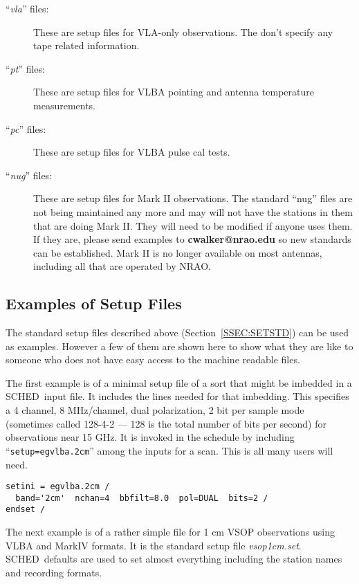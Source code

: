 \documentclass{report}
\newcommand{\schedb}{{\sc SCHED~}}
\begin{document}
\begin{description}
\item[``{\sl vla}'' files:]  These are setup files for VLA-only
observations.  The don't specify any tape related information.

\item[``{\sl pt}'' files:] These are setup files for VLBA pointing and
antenna temperature measurements.

\item[``{\sl pc}'' files:] These are setup files for VLBA pulse cal
tests.

\item[``{\sl nug}'' files:]  These are setup files for Mark II
observations.  The standard ``nug'' files are not being maintained any
more and may will not have the stations in them that are doing Mark
II.  They will need to be modified if anyone uses them.  If they are,
please send examples to {\bf cwalker@nrao.edu} so new standards can be
established.  Mark II is no longer available on most antennas,
including all that are operated by NRAO.

\end{description}



\subsection{\label{SSEC:SETEGS}Examples of Setup Files}

The standard setup files described above (Section~\ref{SSEC:SETSTD})
can be used as examples.  However a few of them are shown here
to show what they are like to someone who does not have easy access
to the machine readable files.

\newpage

  The first example is of a minimal setup file of a sort that might be
imbedded in a \schedb input file.  It includes the lines needed for
that imbedding.  This specifies a 4 channel, 8 MHz/channel, dual
polarization, 2 bit per sample mode (sometimes called 128-4-2 --- 128
is the total number of bits per second) for observations near 15 GHz.
It is invoked in the schedule by including ``{\tt setup=egvlba.2cm}''
among the inputs for a scan.  This is all many users will need.

\begin{verbatim}
setini = egvlba.2cm /
  band='2cm'  nchan=4  bbfilt=8.0  pol=DUAL  bits=2 /
endset /
\end{verbatim}

  The next example is of a rather simple file for 1 cm VSOP
observations using VLBA and MarkIV formats.  It is the standard setup
file {\sl vsop1cm.set}.  \schedb defaults are used to set almost
everything including the station names and recording formats.
\end{document}

